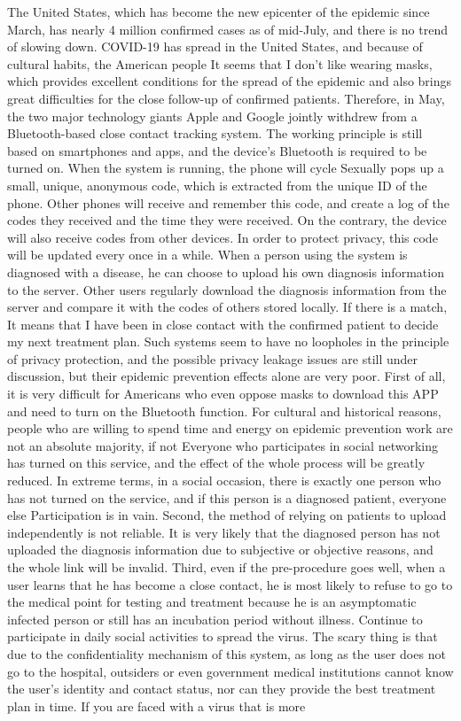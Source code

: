 \documentclass[conference]{IEEEtran}
\begin{document}
\par The United States, which has become the new epicenter of the epidemic since March, has nearly 4 million confirmed cases as of mid-July, and there is no trend of slowing down. COVID-19 has spread in the United States, and because of cultural habits, the American people It seems that I don't like wearing masks, which provides excellent conditions for the spread of the epidemic and also brings great difficulties for the close follow-up of confirmed patients. Therefore, in May, the two major technology giants Apple and Google jointly withdrew from a Bluetooth-based close contact tracking system. The working principle is still based on smartphones and apps, and the device’s Bluetooth is required to be turned on. When the system is running, the phone will cycle Sexually pops up a small, unique, anonymous code, which is extracted from the unique ID of the phone. Other phones will receive and remember this code, and create a log of the codes they received and the time they were received. On the contrary, the device will also receive codes from other devices. In order to protect privacy, this code will be updated every once in a while. When a person using the system is diagnosed with a disease, he can choose to upload his own diagnosis information to the server. Other users regularly download the diagnosis information from the server and compare it with the codes of others stored locally. If there is a match, It means that I have been in close contact with the confirmed patient to decide my next treatment plan. Such systems seem to have no loopholes in the principle of privacy protection, and the possible privacy leakage issues are still under discussion, but their epidemic prevention effects alone are very poor. First of all, it is very difficult for Americans who even oppose masks to download this APP and need to turn on the Bluetooth function. For cultural and historical reasons, people who are willing to spend time and energy on epidemic prevention work are not an absolute majority, if not Everyone who participates in social networking has turned on this service, and the effect of the whole process will be greatly reduced. In extreme terms, in a social occasion, there is exactly one person who has not turned on the service, and if this person is a diagnosed patient, everyone else Participation is in vain. Second, the method of relying on patients to upload independently is not reliable. It is very likely that the diagnosed person has not uploaded the diagnosis information due to subjective or objective reasons, and the whole link will be invalid. Third, even if the pre-procedure goes well, when a user learns that he has become a close contact, he is most likely to refuse to go to the medical point for testing and treatment because he is an asymptomatic infected person or still has an incubation period without illness. Continue to participate in daily social activities to spread the virus. The scary thing is that due to the confidentiality mechanism of this system, as long as the user does not go to the hospital, outsiders or even government medical institutions cannot know the user’s identity and contact status, nor can they provide the best treatment plan in time. If you are faced with a virus that is more 
\end{document}
